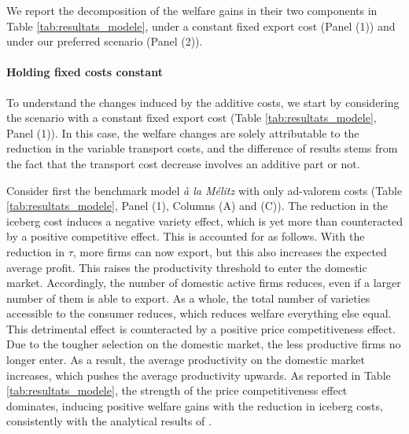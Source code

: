 \documentclass[a4paper,11pt]{article}
\begin{document}
We report the decomposition of the welfare gains in their two components in Table \ref{tab:resultats_modele}, under a constant fixed export cost (Panel (1)) and under our preferred scenario (Panel (2)). \medskip


\paragraph{Holding fixed costs constant} To understand the changes induced by the additive costs, we start by considering the scenario with a constant fixed export cost (Table  \ref{tab:resultats_modele}, Panel (1)). In this case, the welfare changes are solely attributable to the reduction in the variable transport costs, and the difference of results stems from the fact that the transport cost decrease involves an additive part or not.

Consider first the benchmark model \textit{\`{a} la M\'{e}litz} with only ad-valorem costs (Table \ref{tab:resultats_modele}, Panel (1), Columns (A) and (C)). The reduction in the iceberg cost induces a negative variety effect, which is yet
more than counteracted by a positive competitive effect. This is accounted for as follows. With the reduction in $\tau$, more firms can now export, but this also increases the expected average profit. This raises the productivity threshold to enter the domestic
market. Accordingly, the number of domestic active firms reduces, even if a larger number
of them is able to export. As a whole, the total number of varieties accessible to the
consumer reduces, which reduces welfare everything else equal.
This detrimental effect is counteracted by a positive price competitiveness effect. Due
to the tougher selection on the domestic market, the less productive firms no longer enter.
As a result, the average productivity on the domestic market increases, which pushes
the average productivity upwards. As reported in Table \ref{tab:resultats_modele}, the strength of the price
competitiveness effect dominates, inducing positive welfare gains with the reduction in
iceberg costs, consistently with the analytical results of \cite{melitz}.
\end{document}
